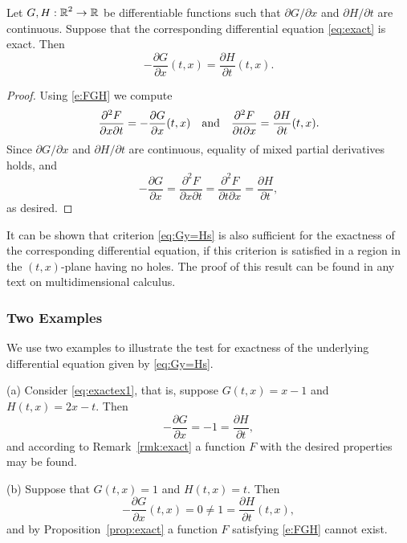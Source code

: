 \documentclass{ximera}
\begin{document}
\begin{proposition} \label{prop:exact}
Let $G,H:\mbox{$\mathbb{R}$}^2\to\mbox{$\mathbb{R}$}$ be differentiable functions such that
$\partial G/\partial x$ and $\partial H/\partial t$ are
continuous.  Suppose that the corresponding differential
equation \eqref{eq:exact} is exact.  Then
\begin{equation} \label{eq:Gy=Hs}
-\frac{\partial G}{\partial x} (t,x) = \frac{\partial H}{\partial
t} (t,x).
\end{equation}
\end{proposition}

\begin{proof} Using \eqref{e:FGH} we compute
\[
\frac{\partial^2 F}{\partial x\partial t} = 
-\frac{\partial G}{\partial x} (t,x) \quad\mbox{and}\quad 
\frac{\partial^2 F}{\partial t\partial x} = 
\frac{\partial H}{\partial t} (t,x).
\]
Since $\partial G/\partial x$ and $\partial H/\partial t$ are
continuous, equality of mixed partial derivatives holds, and
\[
-\frac{\partial G}{\partial x} = 
\frac{\partial^2 F}{\partial x\partial t} =
\frac{\partial^2 F}{\partial t\partial x} =
\frac{\partial H}{\partial t},
\]
as desired. \end{proof}

\begin{remark} \label{rmk:exact}
{\rm It can be shown that criterion \eqref{eq:Gy=Hs} is also
sufficient for the exactness of the corresponding differential
equation, if this criterion is satisfied in a region in the
$(t,x)$-plane having no holes. The proof of this result can be
found in any text on multidimensional calculus.}
\end{remark}


\subsubsection*{Two Examples}

We use two examples to illustrate the test for exactness
of the underlying differential equation given by \eqref{eq:Gy=Hs}.

\noindent (a) Consider \eqref{eq:exactex1}, that is, suppose $G(t,x)=x-1$ and 
$H(t,x)=2x-t$.  Then
\[
-\frac{\partial G}{\partial x} = -1 = 
\frac{\partial H}{\partial t},
\]
and according to Remark~\ref{rmk:exact} a function $F$ with the desired 
properties may be found.

\noindent (b) Suppose that $G(t,x) = 1$ and $H(t,x) = t$.  Then 
\[
-\frac{\partial G}{\partial x} (t,x) = 0\not= 1 = 
\frac{\partial H}{\partial t} (t,x),
\]
and by Proposition~\ref{prop:exact} a function $F$ satisfying \eqref{e:FGH} 
cannot exist.
\end{document}

